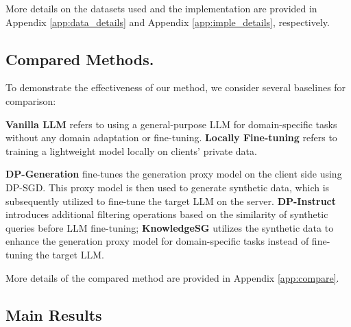 More details on the datasets used and the implementation are provided in Appendix \ref{app:data_details} and Appendix \ref{app:imple_details}, respectively.

\subsection{Compared Methods.}
To demonstrate the effectiveness of our method, we consider several baselines for comparison:

\textbf{Vanilla LLM} refers to using a general-purpose LLM for domain-specific tasks without any domain adaptation or fine-tuning. 
\textbf{Locally Fine-tuning} refers to training a lightweight model locally on clients' private data. 

\textbf{DP-Generation} \citep{Kurakin2023HarnessingLM} fine-tunes the generation proxy model on the client side using DP-SGD. This proxy model is then used to generate synthetic data, which is subsequently utilized to fine-tune the target LLM on the server.
\textbf{DP-Instruct} \citep{dayu2024privacy} introduces additional filtering operations based on the similarity of synthetic queries before LLM fine-tuning;
\textbf{KnowledgeSG} \citep{Wang2024KnowledgeSGPS} utilizes the synthetic data to enhance the generation proxy model for domain-specific tasks instead of fine-tuning the target LLM.

More details of the compared method are provided in Appendix \ref{app:compare}. 

\subsection{Main Results}


